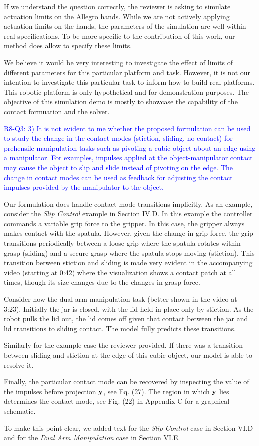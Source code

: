 If we understand the question correctly, the reviewer is asking to simulate
actuation limits on the Allegro hands. While we are not actively applying
actuation limits on the hands, the parameters of the simulation are well within
real specifications. To be more specific to the contribution of this work, our
method does allow to specify these limits. 

We believe it would be very interesting to investigate the effect of limits of different
parameters for this particular platform and task. However, it is not our
intention to investigate this particular task to inform how to
build real platforms. This robotic platform is only hypothetical and for
demonstration purposes. The objective of this simulation demo is mostly to
showcase the capability of the contact formuation and the solver.

\vspace{5mm}
\textcolor{blue}{R8-Q3: 3) It is not evident to me whether the proposed
formulation can be used to study the change in the contact modes (stiction,
sliding, no contact) for prehensile manipulation tasks such as pivoting a cubic
object about an edge using a manipulator. For examples, impulses applied at the
object-manipulator contact may cause the object to slip and slide instead of
pivoting on the edge. The change in contact modes can be used as feedback for
adjusting the contact impulses provided by the manipulator to the object.}

Our formulation does handle contact mode transitions implicitly. As an example, consider
the \emph{Slip Control} example in Section IV.D. In this example the controller
commands a variable grip force to the gripper. In this case, the gripper always
makes contact with the spatula. However, given the change in grip force, the
grip transitions periodically between a loose grip where the spatula rotates
within grasp (sliding) and a secure grasp where the spatula stops moving
(stiction). This transition between stiction and sliding is made very evident in
the accompanying video (starting at 0:42) where the visualization shows a
contact patch at all times, though its size changes due to the changes in grasp
force.

Consider now the dual arm manipulation task (better shown in the video at 3:23).
Initially the jar is closed, with the lid held in place only by stiction. As the
robot pulls the lid out, the lid comes off given that contact between the jar
and lid transitions to sliding contact. The model fully predicts these
transitions.

Similarly for the example case the reviewer provided. If there was a transition
between sliding and stiction at the edge of this cubic object, our model is able
to resolve it. 

Finally, the particular contact mode can be recovered by inspecting the value of
the impulses before projection ${\mathbf{y}}$, see Eq. (27). The region in which
${\mathbf{y}}$ lies determines the contact mode, see Fig. (22) in Appendix C for a
graphical schematic.

To make this point clear, we added text for the \emph{Slip Control} case in
Section VI.D and for the \emph{Dual Arm Manipulation} case in Section VI.E.
